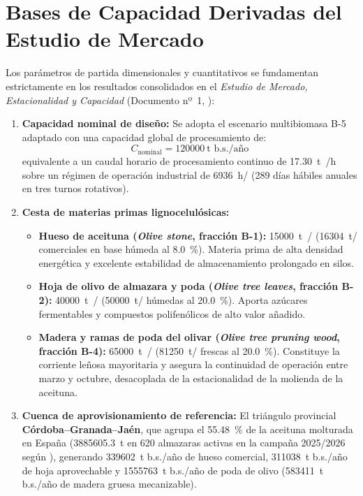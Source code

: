\documentclass{report}
\begin{document}
\section{Bases de Capacidad Derivadas del Estudio de Mercado}
Los parámetros de partida dimensionales y cuantitativos se fundamentan estrictamente en los resultados consolidados en el \textit{Estudio de Mercado, Estacionalidad y Capacidad} (Documento nº~1, \textcite{PerezHita2026}):
\begin{enumerate}
    \item \textbf{Capacidad nominal de diseño:} Se adopta el escenario multibiomasa B-5 adaptado con una capacidad global de procesamiento de:
          \begin{equation}
              C_{\text{nominal}} = \SI{120000}{\tonne\text{ b.s.}/\text{año}}
          \end{equation}
          equivalente a un caudal horario de procesamiento continuo de \SI{17.30}{\tonne{}/h} sobre un régimen de operación industrial de \SI{6936}{h/} (\num{289} días hábiles anuales en tres turnos rotativos).
    \item \textbf{Cesta de materias primas lignocelulósicas:}
          \begin{itemize}
              \item \textbf{Hueso de aceituna (\textit{Olive stone}, fracción B-1):} \SI{15000}{\tonne{}/} (\SI{16304}{\tonne/} comerciales en base húmeda al \SI{8.0}{\percent}). Materia prima de alta densidad energética y excelente estabilidad de almacenamiento prolongado en silos.
              \item \textbf{Hoja de olivo de almazara y poda (\textit{Olive tree leaves}, fracción B-2):} \SI{40000}{\tonne{}/} (\SI{50000}{\tonne/} húmedas al \SI{20.0}{\percent}). Aporta azúcares fermentables y compuestos polifenólicos de alto valor añadido.
              \item \textbf{Madera y ramas de poda del olivar (\textit{Olive tree pruning wood}, fracción B-4):} \SI{65000}{\tonne{}/} (\SI{81250}{\tonne/} frescas al \SI{20.0}{\percent}). Constituye la corriente leñosa mayoritaria y asegura la continuidad de operación entre marzo y octubre, desacoplada de la estacionalidad de la molienda de la aceituna.
          \end{itemize}
    \item \textbf{Cuenca de aprovisionamiento de referencia:} El triángulo provincial \textbf{Córdoba--Granada--Jaén}, que agrupa el \SI{55.48}{\percent} de la aceituna molturada en España (\num{3885605.3}~t en \num{620} almazaras activas en la campaña 2025/2026 según \textcite{AICA2026}), generando \num{339602}~t b.s./año de hueso comercial, \num{311038}~t b.s./año de hoja aprovechable y \num{1555763}~t b.s./año de poda de olivo (\num{583411}~t b.s./año de madera gruesa mecanizable).

\end{enumerate}
\end{document}
